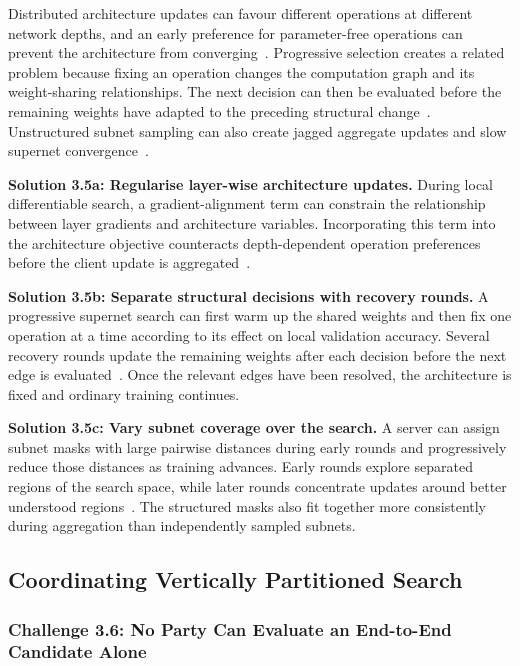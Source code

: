 Distributed architecture updates can favour different operations at different network depths, and an early preference for parameter-free operations can prevent the architecture from converging~\cite{remote_sensing_fednas_2025}. Progressive selection creates a related problem because fixing an operation changes the computation graph and its weight-sharing relationships. The next decision can then be evaluated before the remaining weights have adapted to the preceding structural change~\cite{spider_2021}. Unstructured subnet sampling can also create jagged aggregate updates and slow supernet convergence~\cite{divide-and-conquer_fednas_2023}.

\noindent\textbf{Solution 3.5a: Regularise layer-wise architecture updates.} During local differentiable search, a gradient-alignment term can constrain the relationship between layer gradients and architecture variables. Incorporating this term into the architecture objective counteracts depth-dependent operation preferences before the client update is aggregated~\cite{remote_sensing_fednas_2025}.

\noindent\textbf{Solution 3.5b: Separate structural decisions with recovery rounds.} A progressive supernet search can first warm up the shared weights and then fix one operation at a time according to its effect on local validation accuracy. Several recovery rounds update the remaining weights after each decision before the next edge is evaluated~\cite{spider_2021}. Once the relevant edges have been resolved, the architecture is fixed and ordinary training continues.

\noindent\textbf{Solution 3.5c: Vary subnet coverage over the search.} A server can assign subnet masks with large pairwise distances during early rounds and progressively reduce those distances as training advances. Early rounds explore separated regions of the search space, while later rounds concentrate updates around better understood regions~\cite{divide-and-conquer_fednas_2023}. The structured masks also fit together more consistently during aggregation than independently sampled subnets.

\subsection{Coordinating Vertically Partitioned Search}

\subsubsection{Challenge 3.6: No Party Can Evaluate an End-to-End Candidate Alone}

